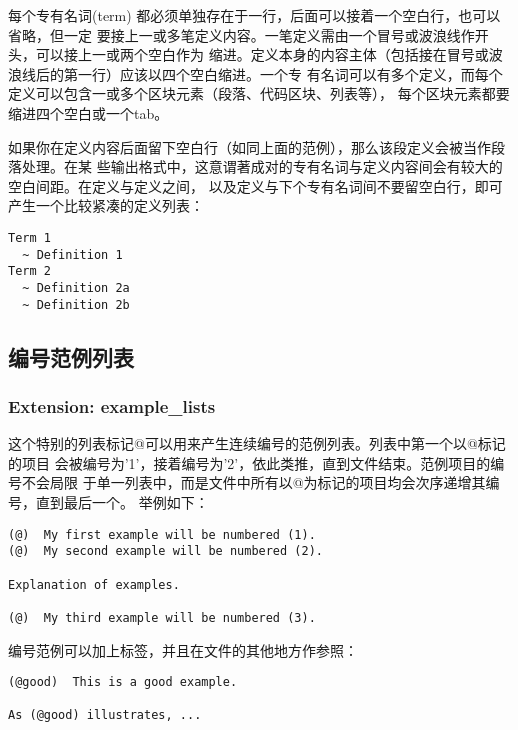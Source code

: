 \documentclass[cn]{elegantbook}
\begin{document}
每个专有名词(term)
都必须单独存在于一行，后面可以接着一个空白行，也可以省略，但一定
要接上一或多笔定义内容。一笔定义需由一个冒号或波浪线作开头，可以接上一或两个空白作为
缩进。定义本身的内容主体（包括接在冒号或波浪线后的第一行）应该以四个空白缩进。一个专
有名词可以有多个定义，而每个定义可以包含一或多个区块元素（段落、代码区块、列表等），
每个区块元素都要缩进四个空白或一个tab。

如果你在定义内容后面留下空白行（如同上面的范例），那么该段定义会被当作段落处理。在某
些输出格式中，这意谓著成对的专有名词与定义内容间会有较大的空白间距。在定义与定义之间，
以及定义与下个专有名词间不要留空白行，即可产生一个比较紧凑的定义列表：

\begin{lstlisting}
Term 1
  ~ Definition 1
Term 2
  ~ Definition 2a
  ~ Definition 2b
\end{lstlisting}

\hypertarget{ux7f16ux53f7ux8303ux4f8bux5217ux8868}{%
\subsection{编号范例列表}\label{ux7f16ux53f7ux8303ux4f8bux5217ux8868}}

\hypertarget{extension-example_lists}{%
\subsubsection{Extension:
example\_lists}\label{extension-example_lists}}

这个特别的列表标记@可以用来产生连续编号的范例列表。列表中第一个以@标记的项目
会被编号为'1'，接着编号为'2'，依此类推，直到文件结束。范例项目的编号不会局限
于单一列表中，而是文件中所有以@为标记的项目均会次序递增其编号，直到最后一个。
举例如下：

\begin{lstlisting}
(@)  My first example will be numbered (1).
(@)  My second example will be numbered (2).

Explanation of examples.

(@)  My third example will be numbered (3).
\end{lstlisting}

编号范例可以加上标签，并且在文件的其他地方作参照：

\begin{lstlisting}
(@good)  This is a good example.

As (@good) illustrates, ...
\end{lstlisting}
\end{document}
